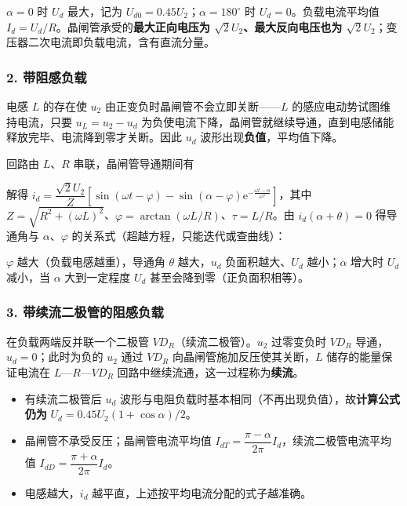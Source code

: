 
$\alpha=0$ 时 $U_d$ 最大，记为 $U_{d0}=0.45U_2$；$\alpha=180^\circ$ 时 $U_d=0$。负载电流平均值 $I_d=U_d/R$。晶闸管承受的\textbf{最大正向电压为 $\sqrt{2}U_2$、最大反向电压也为 $\sqrt{2}U_2$}；变压器二次电流即负载电流，含有直流分量。

\subsubsection*{2. 带阻感负载}

电感 $L$ 的存在使 $u_2$ 由正变负时晶闸管不会立即关断——$L$ 的感应电动势试图维持电流，只要 $u_L=u_2-u_d$ 为负使电流下降，晶闸管就继续导通，直到电感储能释放完毕、电流降到零才关断。因此 $u_d$ 波形出现\textbf{负值}，平均值下降。

回路由 $L$、$R$ 串联，晶闸管导通期间有

解得 $i_d=\dfrac{\sqrt{2}U_2}{Z}\left[\sin(\omega t-\varphi)-\sin(\alpha-\varphi)\mathrm{e}^{-\frac{\omega t-\alpha}{\omega\tau}}\right]$，其中 $Z=\sqrt{R^2+(\omega L)^2}$、$\varphi=\arctan(\omega L/R)$、$\tau=L/R$。由 $i_d(\alpha+\theta)=0$ 得导通角与 $\alpha$、$\varphi$ 的关系式（超越方程，只能迭代或查曲线）：


$\varphi$ 越大（负载电感越重），导通角 $\theta$ 越大，$u_d$ 负面积越大、$U_d$ 越小；$\alpha$ 增大时 $U_d$ 减小，当 $\alpha$ 大到一定程度 $U_d$ 甚至会降到零（正负面积相等）。

\subsubsection*{3. 带续流二极管的阻感负载}

在负载两端反并联一个二极管 $VD_R$（续流二极管）。$u_2$ 过零变负时 $VD_R$ 导通，$u_d=0$；此时为负的 $u_2$ 通过 $VD_R$ 向晶闸管施加反压使其关断，$L$ 储存的能量保证电流在 $L$—$R$—$VD_R$ 回路中继续流通，这一过程称为\textbf{续流}。

\begin{itemize}
  \item 有续流二极管后 $u_d$ 波形与电阻负载时基本相同（不再出现负值），故\textbf{计算公式仍为} $U_d=0.45U_2(1+\cos\alpha)/2$。
  \item 晶闸管不承受反压；晶闸管电流平均值 $I_{dT}=\dfrac{\pi-\alpha}{2\pi}I_d$，续流二极管电流平均值 $I_{dD}=\dfrac{\pi+\alpha}{2\pi}I_d$。
  \item 电感越大，$i_d$ 越平直，上述按平均电流分配的式子越准确。
\end{itemize}

